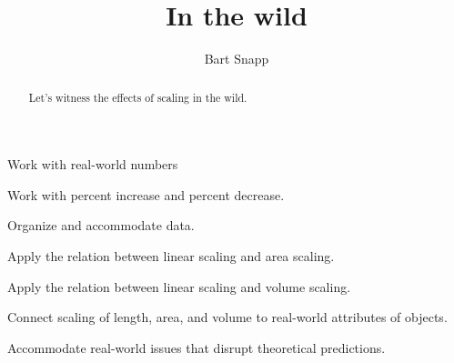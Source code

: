 \documentclass[nooutcomes,noauthor]{ximera}
\title{In the wild}
\author{Bart Snapp}
\begin{document}
\begin{abstract}
  Let's witness the effects of scaling in the wild.
\end{abstract}
\maketitle


\begin{listOutcomes}
\item Work with real-world numbers
\item Work with percent increase and percent decrease.
\item Organize and accommodate data.
\item Apply the relation between linear scaling and area scaling.
\item Apply the relation between linear scaling and volume scaling.
\item Connect scaling of length, area, and volume to real-world
  attributes of objects.
\item Accommodate real-world issues that disrupt theoretical predictions.
\end{listOutcomes}





\mynewpage
\end{document}
